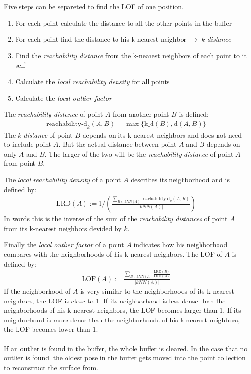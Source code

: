 Five steps can be separeted to find the LOF of one position.
\begin{enumerate}
  \item{For each point calculate the distance to all the other points in the buffer}
  \item{For each point find the distance to his k-nearest neighbor $\rightarrow$
      \textit{k-distance}}
  \item{Find the \textit{reachability distance} from the k-nearest neighbors
      of each point to it self}
  \item{Calculate the \textit{local reachability density} for all points}
  \item{Calculate the \textit{local outlier factor}}
\end{enumerate}
The \textit{reachability distance} of point $A$ from another point $B$ is defined:
\begin{gather*}
  \mbox{reachability-d}_k(A,B)=\max\{\mbox{k\_d}(B), \mbox{d}(A,B)\}
\end{gather*}
The \textit{k-distance} of point $B$ depends on its k-nearest neighbors
and does not need to include point $A$.
But the actual distance between point $A$ and $B$ depends on only $A$
and $B$. The larger of the two will be the \textit{reachability distance} of
point $A$ from point $B$.

The \textit{local reachability density} of a point $A$ describes its neighborhood
and is defined by:
\begin{gather*}
  \mbox{LRD}(A):=1/\left(\frac{\sum_{B\in kNN(A)}\mbox{reachability-d}_k(A, B)}{|kNN(A)|}\right)
\end{gather*}
In words this is the inverse of the sum of the \textit{reachability distances} of point $A$
from its k-nearest neighbors devided by $k$.

Finally the \textit{local outlier factor} of a point $A$ indicates how his
neighborhood compares with the neighborhoods of his k-nearest neighbors. The LOF
of $A$ is defined by:
\begin{gather*}
  \mbox{LOF}(A):=\frac{\sum_{B\in kNN(A)}\frac{\mbox{LRD}(B)}{\mbox{LRD}(A)}}{|kNN(A)|}
\end{gather*}
If the neighborhood of $A$ is very similar to the neighborhoods of its k-nearest
neighbors, the LOF is close to 1. If its neighborhood is less dense than the
neighborhoods of his k-nearest neighbors, the LOF becomes larger than 1. If its
neighborhood is more dense than the neighborhoods of his k-nearest neighbors,
the LOF becomes lower than 1. \\
 \\
If an outlier is found in the buffer, the whole buffer is cleared. In the case
that no outlier is found, the oldest pose in the buffer gets moved into the
point collection to reconstruct the surface from.
